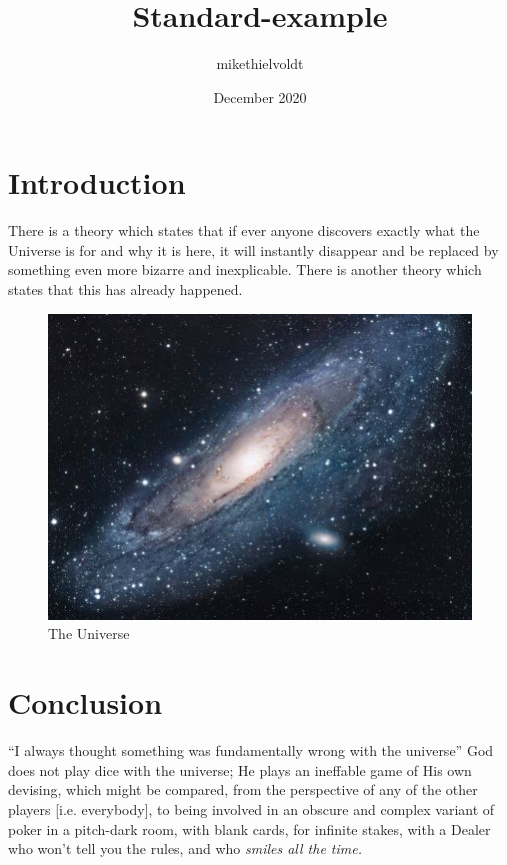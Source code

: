 \documentclass{article}
\title{Standard-example}
\author{mikethielvoldt }
\date{December 2020}
\begin{document}
\maketitle

\section{Introduction}
There is a theory which states that if ever anyone discovers exactly what the Universe is for and why it is here, it will instantly disappear and be replaced by something even more bizarre and inexplicable.
There is another theory which states that this has already happened.



\begin{figure}[h!]
\centering
\includegraphics[scale=1.7]{universe}
\caption{The Universe}
\label{fig:universe}
\end{figure}

\section{Conclusion}
``I always thought something was fundamentally wrong with the universe'' \citep{adams1995hitchhiker}\newline
\newline
God does not play dice with the universe; He plays an ineffable game of His own devising, which might be compared, from the perspective of any of the other players [i.e. everybody], to being involved in an obscure and complex variant of poker in a pitch-dark room, with blank cards, for infinite stakes, with a Dealer who won't tell you the rules, and who \em{smiles all the time}.



\end{document}
